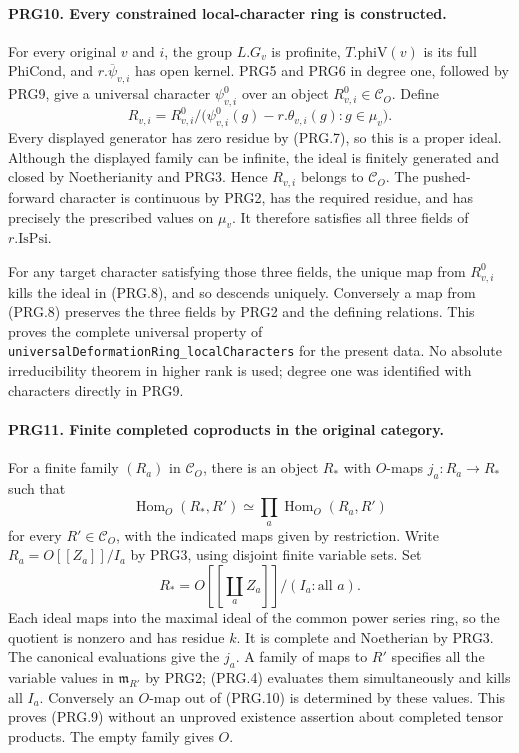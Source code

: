 \paragraph{PRG10. Every constrained local-character ring is constructed.}
\label{claim:PRG10}
For every original \(v\) and \(i\), the group \(L.G_v\) is
profinite, \(T.\mathrm{phiV}(v)\) is its full
\(\mathrm{PhiCond}\), and \(r.\overline\psi_{v,i}\) has open
kernel. PRG5 and PRG6 in degree one, followed by PRG9, give a
universal character \(\psi^0_{v,i}\) over an object
\(R^0_{v,i}\in\mathcal C_O\). Define
\[
 R_{v,i}=R^0_{v,i}/
 \bigl(\psi^0_{v,i}(g)-r.\theta_{v,i}(g):g\in\mu_v\bigr).
 \tag{PRG.8}
\]
Every displayed generator has zero residue by (PRG.7), so this is
a proper ideal. Although the displayed family can be infinite,
the ideal is finitely generated and closed by Noetherianity and
PRG3. Hence \(R_{v,i}\) belongs to \(\mathcal C_O\).
The pushed-forward character is continuous by PRG2, has the
required residue, and has precisely the prescribed values on
\(\mu_v\). It therefore satisfies all three fields of
\(r.\mathrm{IsPsi}\).

For any target character satisfying those three fields, the unique
map from \(R^0_{v,i}\) kills the ideal in (PRG.8), and so descends
uniquely. Conversely a map from (PRG.8) preserves the three fields
by PRG2 and the defining relations. This proves the complete
universal property of
\texttt{universalDeformationRing\_localCharacters} for the present
data. No absolute irreducibility theorem in higher rank is used;
degree one was identified with characters directly in PRG9.

\paragraph{PRG11. Finite completed coproducts in the original category.}
\label{claim:PRG11}
For a finite family \((R_a)\) in \(\mathcal C_O\), there is an
object \(R_*\) with \(O\)-maps \(j_a:R_a\to R_*\) such that
\[
 \operatorname{Hom}_O(R_*,R')
 \simeq\prod_a\operatorname{Hom}_O(R_a,R')                 \tag{PRG.9}
\]
for every \(R'\in\mathcal C_O\), with the indicated maps given
by restriction. Write \(R_a=O[[Z_a]]/I_a\) by PRG3, using disjoint
finite variable sets. Set
\[
 R_*=O[[\coprod_a Z_a]]/(I_a:\text{all }a).                 \tag{PRG.10}
\]
Each ideal maps into the maximal ideal of the common power series
ring, so the quotient is nonzero and has residue \(k\). It is
complete and Noetherian by PRG3. The canonical evaluations give
the \(j_a\). A family of maps to \(R'\) specifies all the variable
values in \(\mathfrak m_{R'}\) by PRG2; (PRG.4) evaluates them
simultaneously and kills all \(I_a\). Conversely an \(O\)-map
out of (PRG.10) is determined by these values. This proves (PRG.9)
without an unproved existence assertion about completed tensor
products. The empty family gives \(O\).


